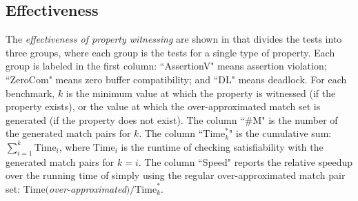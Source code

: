 \subsection{Effectiveness}

The \textit{effectiveness of property witnessing} are shown in  that divides the tests into three groups, where each group is the tests for a single type of property. Each group is labeled in the first column: ``AssertionV" means assertion violation; ``ZeroCom" means zero buffer compatibility; and ``DL" means deadlock. For each benchmark, $k$ is the minimum value at which the property is witnessed (if the property exists), or the value at which the over-approximated match set is generated (if the property does not exist). 
The column ``\#M" is the number of the generated match pairs for $k$. 
The column ``$\mathrm{Time}_k^\ast$" is the cumulative sum: $\sum_{i=1}^k\mathrm{Time}_i$, where $\mathrm{Time}_i$ is the runtime of checking satisfiability with the generated match pairs for $k=i$.
The column ``Speed" reports the relative speedup over the running time of simply using the regular over-approximated match pair set: $\mathrm{Time}($\textit{over-approximated}$) / \mathrm{Time}_k^\ast$.

